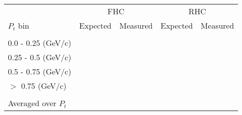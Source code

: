 \begin{tabular}{lcccc} \hline \hline
               			& \multicolumn{2}{c}{FHC}			& \multicolumn{2}{c}{RHC}   \\
$P_{t}$ bin				& Expected 			& Measured      		& Expected  & Measured      \\ \hline \\ [-8pt]
0.0 - 0.25 (GeV/c) 		& \expfhctrmomi   	& \obsfhctrmomi 		& \exprhctrmomi    & \obsrhctrmomi \\
0.25 - 0.5 (GeV/c)		& \expfhctrmomii   	& \obsfhctrmomii 		& \exprhctrmomii    & \obsrhctrmomii \\
0.5 - 0.75 (GeV/c)		& \expfhctrmomiii   & \obsfhctrmomiii 		& \exprhctrmomiii    & \obsrhctrmomiii \\
$>$ 0.75 (GeV/c)  		& \expfhctrmomiv   	& \obsfhctrmomiv 		& \exprhctrmomiv    & \obsrhctrmomiv \\ \hline \\ [-8pt]
Averaged over $P_{t}$	& \expfhcavetrmom	& \obsfhcavetrmom		& \exprhcavetrmom 	& \obsrhcavetrmom \\ \hline
\hline
\end{tabular}
